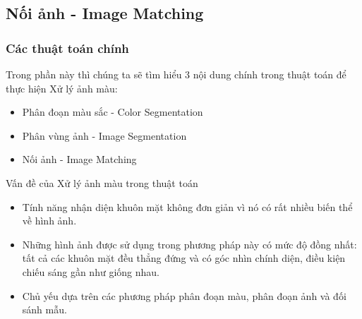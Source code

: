\documentclass[10.5pt]{beamer}
\begin{document}
\subsection{\fontsize{8.5pt}{9.5pt}\selectfont Nối ảnh - Image Matching}
\begin{frame}
	\frametitle{\fontsize{11.5pt}{12.5pt}\selectfont Các thuật toán chính}
	\fontsize{9.5pt}{11.5pt}\selectfont Trong phần này thì chúng ta sẽ tìm hiểu 3 nội dung chính trong thuật toán để thực hiện Xử lý ảnh màu:
	\begin{itemize}
		\item \fontsize{8.25pt}{9.5pt}\selectfont Phân đoạn màu sắc - Color Segmentation
		\item \fontsize{8.25pt}{9.5pt}\selectfont Phân vùng ảnh - Image Segmentation
		\item \fontsize{8.25pt}{9.5pt}\selectfont Nối ảnh - Image Matching
	\end{itemize}
	\fontsize{9.5pt}{11.5pt}\selectfont Vấn đề của Xử lý ảnh màu trong thuật toán
	\begin{itemize}
		\item \fontsize{8.25pt}{9.5pt}\selectfont Tính năng nhận diện khuôn mặt không đơn giản vì nó có rất nhiều biến thể về hình ảnh.
		\item \fontsize{8.25pt}{9.5pt}\selectfont Những hình ảnh được sử dụng trong phương pháp này có mức độ đồng nhất: tất cả các khuôn mặt đều thẳng đứng và có góc nhìn chính diện, điều kiện chiếu sáng gần như giống nhau. 
		\item \fontsize{8.25pt}{9.5pt}\selectfont Chủ yếu dựa trên các phương pháp phân đoạn màu, phân đoạn ảnh và đối sánh mẫu.
	\end{itemize}
\end{frame}
\end{document}
